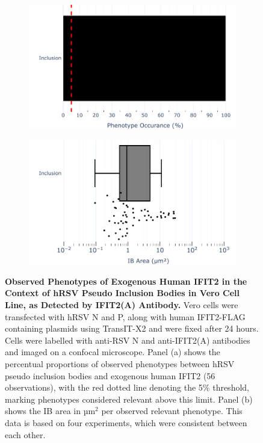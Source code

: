 \begin{figure}
    \begin{subfigure}{0.495\textwidth}
        \caption{}
        \includegraphics[width=1\linewidth]{09. Chapter 4/Figs/01. pIB/03. IFIT2/04. IFIT2-FLAG/01. IFIT2A/01. bar_i2a_hnhp.pdf} 
    \end{subfigure}
    \begin{subfigure}{0.495\textwidth}
        \caption{}
        \includegraphics[width=1\linewidth]{09. Chapter 4/Figs/01. pIB/03. IFIT2/04. IFIT2-FLAG/01. IFIT2A/02. box_i2a_hnhp.pdf}
    \end{subfigure}
    \caption[Observed Phenotypes of Exogenous Human IFIT2 in the Context of hRSV Pseudo Inclusion Bodies in Vero Cell Line, as Detected by IFIT2(A) Antibody.]{\textbf{Observed Phenotypes of Exogenous Human IFIT2 in the Context of hRSV Pseudo Inclusion Bodies in Vero Cell Line, as Detected by IFIT2(A) Antibody.} Vero cells were transfected with hRSV N and P, along with human IFIT2-FLAG containing plasmids using TransIT-X2 and were fixed after 24 hours. Cells were labelled with anti-RSV N and anti-IFIT2(A) antibodies and imaged on a confocal microscope. Panel (a) shows the percentual proportions of observed phenotypes between hRSV pseudo inclusion bodies and exogenous human IFIT2 (56 observations), with the red dotted line denoting the 5\% threshold, marking phenotypes considered relevant above this limit. Panel (b) shows the IB area in \(\mbox{µm}^2\) per observed relevant phenotype. This data is based on four experiments, which were consistent between each other.
}
\end{figure}
